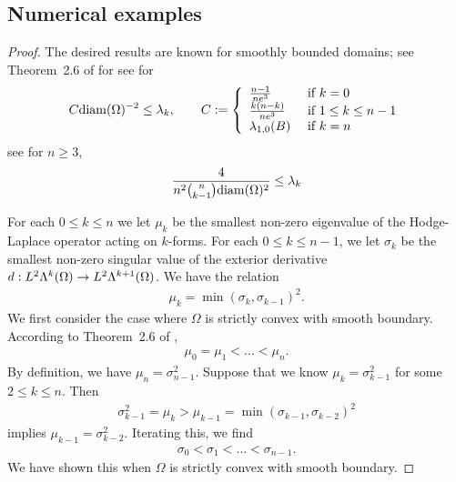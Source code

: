 \documentclass[12pt,a4paper]{article}
\begin{document}
\subsection{Numerical examples}






\begin{proof}
    The desired results are known for smoothly bounded domains;
    see Theorem~2.6 of \cite{guerini2004eigenvalue} for %
    see \cite[Theorem~1.3]{guerini2004spectre} for
    \begin{align*}
        C \diam(\Omega)^{-2} 
        \leq 
        \lambda_{k},
        \qquad 
        C := 
        \left\{\begin{array}{ll}
            \frac{n-1}{n e^{3}} & \text{ if } k=0
            \\
            \frac{k(n-k)}{ne^{3}} & \text{ if } 1 \leq k \leq n-1
            \\
            \lambda_{1,0}(B) & \text{ if } k = n %
        \end{array}\right. 
    \end{align*}
    see \cite{guerini2004eigenvalue} for $n \geq 3$, 
    \begin{align*}
        \frac{4}{n^{2} \tbinom{n}{k-1} {\operatorname{diam}}(\Omega)^{2} } \leq \lambda_{k}
    \end{align*}
    
    For each $0 \leq k \leq n$ we let $\mu_{k}$ be the smallest non-zero eigenvalue of the Hodge-Laplace operator acting on $k$-forms. For each $0 \leq k \leq n-1$, we let $\sigma_{k}$ be the smallest non-zero singular value of the exterior derivative $d : L^{2}\Lambda^{k}(\Omega) \rightarrow L^{2}\Lambda^{k+1}(\Omega)$. We have the relation
    \begin{align*}
        \mu_{k} = \min( \sigma_{k}, \sigma_{k-1} )^{2}.
    \end{align*}
    We first consider the case where $\Omega$ is strictly convex with smooth boundary. 
    According to Theorem~2.6 of \cite{guerini2004eigenvalue},
    \begin{align*}
        \mu_{0} = \mu_{1} < \dots < \mu_{n}.
    \end{align*}
    By definition, we have $\mu_{n} = \sigma_{n-1}^{2}$. 
    Suppose that we know $\mu_{k} = \sigma_{k-1}^{2}$ for some $2 \leq k \leq n$. Then 
    \begin{align*}
        \sigma_{k-1}^{2} = \mu_{k} > \mu_{k-1} = \min( \sigma_{k-1}, \sigma_{k-2} )^{2}
    \end{align*}
    implies $\mu_{k-1} = \sigma_{k-2}^{2}$. 
    Iterating this, we find 
    \begin{align*}
        \sigma_{0} < \sigma_{1} < \dots < \sigma_{n-1}.
    \end{align*}
    We have shown this when $\Omega$ is strictly convex with smooth boundary. 
    

\end{proof}
\end{document}
